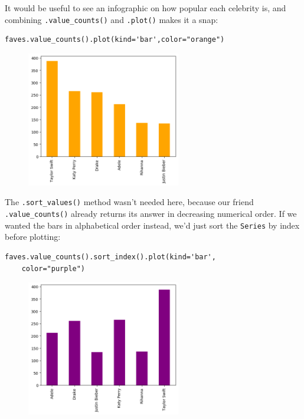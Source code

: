 
It would be useful to see an infographic on how popular each celebrity is, and
combining \texttt{.value\_counts()} and \texttt{.plot()} makes it a snap:

\begin{Verbatim}[fontsize=\small,samepage=true,frame=single,framesep=3mm]
faves.value_counts().plot(kind='bar',color="orange")
\end{Verbatim}

\begin{figure}[ht]
\centering
\includegraphics[width=0.6\textwidth]{celebs.png}
\end{figure}


The \texttt{.sort\_values()} method wasn't needed here, because our friend
\texttt{.value\_counts()} already returns its answer in decreasing numerical
order. If we wanted the bars in alphabetical order instead, we'd just sort the
\texttt{Series} by index before plotting:

\begin{Verbatim}[fontsize=\small,samepage=true,frame=single,framesep=3mm]
faves.value_counts().sort_index().plot(kind='bar',
    color="purple")
\end{Verbatim}

\begin{figure}[ht]
\centering
\includegraphics[width=0.6\textwidth]{celebs2.png}
\end{figure}

